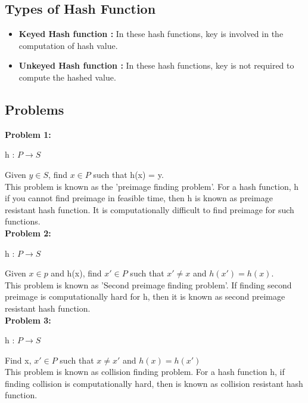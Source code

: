 \documentclass[11pt]{article}
\begin{document}
\subsection{Types of Hash Function}
\begin{itemize}
    \item \textbf{Keyed Hash function : } In these hash functions, key is involved in the computation of hash value.
    \item \textbf{Unkeyed Hash function : } In these hash functions, key is not required to compute the hashed value.
\end{itemize}

\subsection{Problems}
\textbf{Problem 1:}\\
\begin{center}
    h : $ P \rightarrow S$
\end{center}
Given $y \in S$, find $x \in P$ such that h(x) = y. \\
\newline
This problem is known as the 'preimage finding problem'. For a hash function, h if you cannot find preimage in feasible time, then h is known as preimage resistant hash function. It is computationally difficult to find preimage for such functions.\\
\newline
\textbf{Problem 2:}\\
\begin{center}
    h : $ P \rightarrow S$
\end{center}
Given $x \in p$ and h(x), find $x' \in P$ such that $x' \neq x$ and $h(x') = h(x)$.\\
\newline
This problem is known as 'Second preimage finding problem'. If finding second preimage is computationally hard for h, then it is known as second preimage resistant hash function.\\
\newline
\textbf{Problem 3:}\\
\begin{center}
    h : $ P \rightarrow S$
\end{center}
Find x, $x' \in P$ such that $x \neq x'$ and $h(x) = h(x')$\\
\newline
This problem is known as collision finding problem. For a hash function h, if finding collision is computationally hard, then is known as collision resistant hash function.
\end{document}
